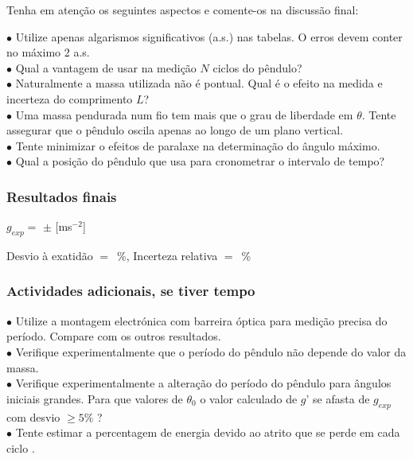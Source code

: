 \documentclass[a4paper,12pt]{article}      %
\begin{document}
Tenha em atenção os seguintes aspectos e comente-os na discussão final:
 \begin{flushleft}
	 $\bullet$ Utilize apenas algarismos significativos (a.s.) nas tabelas. O erros devem conter no máximo 2 a.s. \\
	 $\bullet$ Qual a vantagem de usar na medição $N$ ciclos do pêndulo? \\
	 $\bullet$ Naturalmente a massa utilizada não é pontual. Qual é o efeito na medida e incerteza do comprimento $L$? \\	
	 $\bullet$ Uma massa pendurada num fio tem mais que o grau de liberdade em $\theta$. Tente assegurar que o pêndulo oscila apenas ao longo de um plano vertical. \\
	 $\bullet$ Tente minimizar o efeitos de paralaxe na determinação do ângulo máximo.  \\
	 $\bullet$ Qual a posição do pêndulo que usa para cronometrar o intervalo de tempo?  \\
\end{flushleft} 

\subsubsection*{\sf Resultados finais}
$g_{exp}=$ \underline{\makebox[1.5cm][r]{~}}  $\pm$  	\underline{\makebox[1cm][r]{~}} [ms$^{-2}$]

\noindent  
Desvio à exatidão $=$~\underline{\makebox[1cm][r]{~}}\%, 
Incerteza relativa $=$~\underline{\makebox[1cm][r]{~}}\% 





\subsubsection*{\sf Actividades adicionais, se tiver tempo}
 \begin{flushleft}
	 $\bullet$ Utilize a montagem electrónica com barreira óptica para medição precisa do período. Compare com os outros resultados.\\
	 $\bullet$ Verifique experimentalmente que o período do pêndulo não depende do valor da massa.\\
	 $\bullet$ Verifique experimentalmente a alteração do período do pêndulo para ângulos iniciais grandes. 
	 Para que valores de $\theta_0$ o valor calculado de $g$’ se afasta de $g_{exp}$ com desvio $\ge 5 \%$ ?\\
	 $\bullet$ Tente estimar a percentagem de energia devido ao atrito que se perde em cada ciclo .
\end{flushleft} 
\end{document}
